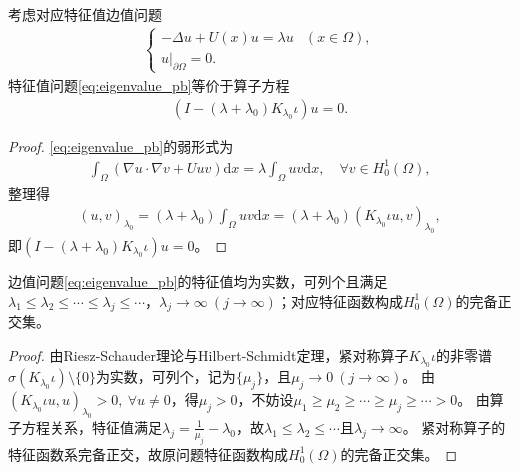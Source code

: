 \documentclass[../../main.tex]{subfiles}%
\begin{document}
\begin{proposition}
考虑对应特征值边值问题
\begin{align}
\begin{cases}
-\Delta u+U(x)u=\lambda u &(x\in\Omega),\\
u|_{\partial\Omega}=0.
\end{cases}
\label{eq:eigenvalue_pb}
\end{align}
特征值问题\eqref{eq:eigenvalue_pb}等价于算子方程
\begin{align*}
\left(I-\left(\lambda+\lambda_0\right)K_{\lambda_0}\iota\right)u=0.
\end{align*}
\end{proposition}
\begin{proof}

\eqref{eq:eigenvalue_pb}的弱形式为
\begin{align*}
\int_{\Omega}\left(\nabla u\cdot\nabla v+Uuv\right)\mathrm{d}x=\lambda\int_{\Omega}uv\mathrm{d}x,\quad\forall v\in H_0^1(\Omega),
\end{align*}
整理得
\begin{align*}
(u,v)_{\lambda_0}=\left(\lambda+\lambda_0\right)\int_{\Omega}uv\mathrm{d}x=\left(\lambda+\lambda_0\right)(K_{\lambda_0}\iota u,v)_{\lambda_0},
\end{align*}
即$\left(I-\left(\lambda+\lambda_0\right)K_{\lambda_0}\iota\right)u=0$。

\end{proof}

\begin{theorem}
边值问题\eqref{eq:eigenvalue_pb}的特征值均为实数，可列个且满足$\lambda_1\leqslant\lambda_2\leqslant\cdots\leqslant\lambda_j\leqslant\cdots$，$\lambda_j\to\infty\ (j\to\infty)$；对应特征函数构成$H_0^1(\Omega)$的完备正交集。
\end{theorem}
\begin{proof}

由Riesz-Schauder理论与Hilbert-Schmidt定理，紧对称算子$K_{\lambda_0}\iota$的非零谱$\sigma(K_{\lambda_0}\iota)\setminus\{0\}$为实数，可列个，记为$\{\mu_j\}$，且$\mu_j\to0\ (j\to\infty)$。
由$(K_{\lambda_0}\iota u,u)_{\lambda_0}>0,\ \forall u\neq0$，得$\mu_j>0$，不妨设$\mu_1\geqslant\mu_2\geqslant\cdots\geqslant\mu_j\geqslant\cdots>0$。
由算子方程关系，特征值满足$\lambda_j=\frac{1}{\mu_j}-\lambda_0$，故$\lambda_1\leqslant\lambda_2\leqslant\cdots$且$\lambda_j\to\infty$。
紧对称算子的特征函数系完备正交，故原问题特征函数构成$H_0^1(\Omega)$的完备正交集。

\end{proof}
\end{document}
